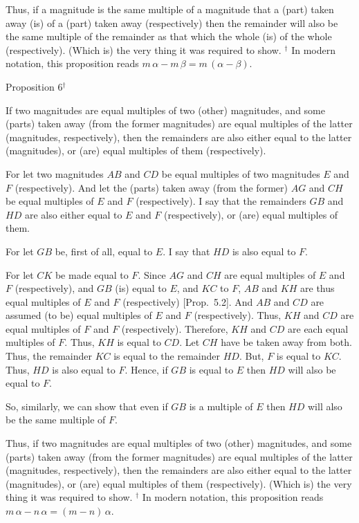  Thus, if a magnitude is the same multiple of a magnitude
that a (part) taken away (is) of a (part) taken away (respectively) then the remainder will
also be the same multiple of the remainder as that  which the whole (is) of the whole (respectively).
  (Which is) the very thing it was required to show.
{\footnotesize \noindent$^\dag$ In modern notation, this
proposition reads $m\,\alpha-m\,\beta=m\,(\alpha-\beta)$.}


\begin{center}
{\large Proposition 6}$^\dag$
\end{center}

If two magnitudes are equal multiples of two (other) magnitudes, and some (parts) taken away (from the former magnitudes) are equal multiples of the latter (magnitudes, respectively),
then the remainders  are also either equal to the latter (magnitudes), or (are) equal multiples of them (respectively).

For let two magnitudes $AB$ and $CD$ be equal multiples of two magnitudes
$E$ and $F$ (respectively). And let the (parts)  taken away (from the former) $AG$ and $CH$ be equal multiples of $E$ and $F$ (respectively). I say that the remainders $GB$ and
$HD$ are also either equal to $E$ and $F$ (respectively), or (are) equal multiples of them.

\epsfysize=1.8in
\centerline{}

For let $GB$ be, first of all, equal to $E$. I say that $HD$ is also equal to $F$.

For let  $CK$ be made equal to $F$. Since $AG$ and $CH$ are equal multiples of $E$ and $F$ (respectively), and $GB$ (is) equal to $E$, and $KC$ to $F$,
$AB$ and $KH$ are thus equal multiples of $E$ and $F$ (respectively)
[Prop.~5.2].
And $AB$ and $CD$ are assumed (to be) equal multiples of $E$ and $F$ (respectively). Thus, $KH$ and $CD$ are equal multiples of $F$ and $F$ (respectively). Therefore, $KH$ and $CD$ are each equal multiples of $F$. Thus, $KH$
is equal to $CD$. Let $CH$ have be taken away from both. Thus, the remainder
$KC$ is equal to the remainder $HD$. But, $F$ is equal to $KC$. Thus, $HD$ is also equal to $F$. Hence, if $GB$ is equal to $E$ then $HD$ will also be equal to $F$.

So, similarly, we can show that even if $GB$ is a multiple of $E$ then $HD$
will also be the same multiple of $F$.

Thus, if two magnitudes are equal multiples of two (other) magnitudes, and some (parts) taken away (from the former magnitudes) are equal multiples of the latter (magnitudes, respectively),
then the remainders  are also either equal to the latter (magnitudes), or (are) equal multiples of them (respectively). (Which is) the very thing it was required to show.
{\footnotesize \noindent$^\dag$ In modern notation, this
proposition reads $m\,\alpha-n\,\alpha = (m-n)\,\alpha$.}

